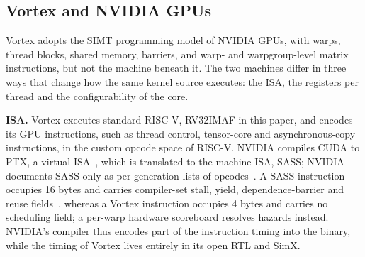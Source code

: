 \subsection{Vortex and NVIDIA GPUs}
\label{sec:bg_nvidia}

Vortex adopts the SIMT programming model of NVIDIA GPUs, with warps, thread blocks, shared memory, barriers, and warp- and warpgroup-level matrix instructions, but not the machine beneath it. The two machines differ in three ways that change how the same kernel source executes: the ISA, the registers per thread and the configurability of the core.

\textbf{ISA.} Vortex executes standard RISC-V, RV32IMAF in this paper, and encodes its GPU instructions, such as thread control, tensor-core and asynchronous-copy instructions, in the custom opcode space of RISC-V. NVIDIA compiles CUDA to PTX, a virtual ISA~\cite{nvidia2026ptxisa}, which is translated to the machine ISA, SASS; NVIDIA documents SASS only as per-generation lists of opcodes~\cite{nvidia2026binutils}. A SASS instruction occupies 16 bytes and carries compiler-set stall, yield, dependence-barrier and reuse fields~\cite{10.1145/3725843.3756041}, whereas a Vortex instruction occupies 4 bytes and carries no scheduling field; a per-warp hardware scoreboard resolves hazards instead. NVIDIA's compiler thus encodes part of the instruction timing into the binary, while the timing of Vortex lives entirely in its open RTL and SimX.

